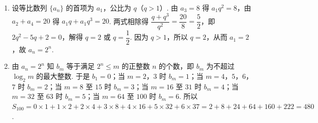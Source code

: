 \begin{solution}
\begin{enumerate}
\item 设等比数列 \(\{a_n\}\) 的首项为 \(a_1\)，公比为 \(q\)（\(q>1\)）. 由 \(a_3=8\) 得 \(a_1q^2=8\)，由 \(a_2+a_4=20\) 得 \(a_1q+a_1q^3=20\). 两式相除得 \(\dfrac{q+q^3}{q^2}=\dfrac{20}{8}=\dfrac52\)，即 \(2q^2-5q+2=0\)，解得 \(q=2\) 或 \(q=\dfrac12\). 因为 \(q>1\)，所以 \(q=2\)，从而 \(a_1=2\)，故 \(a_n=2^n\).
\item 由 \(a_n=2^n\) 知 \(b_m\) 等于满足 \(2^n\le m\) 的正整数 \(n\) 的个数，即 \(b_m\) 为不超过 \(\log_2m\) 的最大整数. 于是 \(b_1=0\)；当 \(m=2\)，\(3\) 时 \(b_m=1\)；当 \(m=4\)，\(5\)，\(6\)，\(7\) 时 \(b_m=2\)；当 \(m=8\) 至 \(15\) 时 \(b_m=3\)；当 \(m=16\) 至 \(31\) 时 \(b_m=4\)；当 \(m=32\) 至 \(63\) 时 \(b_m=5\)；当 \(m=64\) 至 \(100\) 时 \(b_m=6\). 所以 \(S_{100}=0\times1+1\times2+2\times4+3\times8+4\times16+5\times32+6\times37=2+8+24+64+160+222=480\).
\end{enumerate}
\end{solution}

